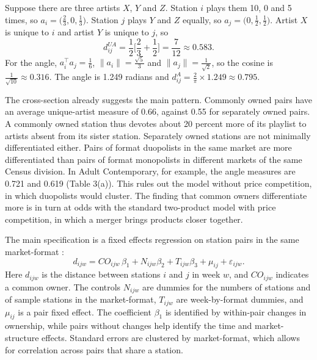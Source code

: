 \begin{example}\label{ex:11-sweeting}
Suppose there are three artists $X$, $Y$ and $Z$. Station $i$ plays them 10, 0 and 5 times, so $a_i = \big(\frac{2}{3},
0, \frac{1}{3}\big)$. Station $j$ plays $Y$ and $Z$ equally, so $a_j = \big(0, \frac{1}{2}, \frac{1}{2}\big)$. Artist
$X$ is unique to $i$ and artist $Y$ is unique to $j$, so
\begin{equation*}
d^{UA}_{ij} = \frac{1}{2}\Big[\frac{2}{3} + \frac{1}{2}\Big] = \frac{7}{12} \approx 0.583 .
\end{equation*}
For the angle, $a_i^{\top}a_j = \frac{1}{6}$, $\lVert a_i\rVert = \frac{\sqrt{5}}{3}$ and $\lVert a_j\rVert =
\frac{1}{\sqrt 2}$, so the cosine is $\frac{1}{\sqrt{10}} \approx 0.316$. The angle is 1.249 radians and
$d^{A}_{ij} = \frac{2}{\pi}\times 1.249 \approx 0.795$.
\end{example}

The cross-section already suggests the main pattern. Commonly owned pairs have an average unique-artist measure of
0.66, against 0.55 for separately owned pairs. A commonly owned station thus devotes about 20 percent more of its
playlist to artists absent from its sister station. Separately owned stations are not minimally differentiated
either. Pairs of format duopolists in the same market are more differentiated than pairs of format monopolists in
different markets of the same Census division. In Adult Contemporary, for example, the angle measures are 0.721 and
0.619 (Table 3(a)). This rules out the model without price competition, in which duopolists would cluster. The
finding that common owners differentiate more is in turn at odds with the standard two-product model with price
competition, in which a merger brings products closer together.

The main specification is a fixed effects regression on station pairs in the same market-format
\citep[eq.~(1)]{Sweeting2010}:
\begin{equation}\label{eq:11-sw-reg}
d_{ijw} = \mathit{CO}_{ijw}\,\beta_1 + N_{ijw}\beta_2 + T_{ijw}\beta_3 + \mu_{ij} + \varepsilon_{ijw}.
\end{equation}
Here $d_{ijw}$ is the distance between stations $i$ and $j$ in week $w$, and $\mathit{CO}_{ijw}$ indicates a common
owner. The controls $N_{ijw}$ are dummies for the numbers of stations and of sample stations in the market-format,
$T_{ijw}$ are week-by-format dummies, and $\mu_{ij}$ is a pair fixed effect. The coefficient $\beta_1$ is identified by within-pair
changes in ownership, while pairs without changes help identify the time and market-structure effects. Standard
errors are clustered by market-format, which allows for correlation across pairs that share a station.

